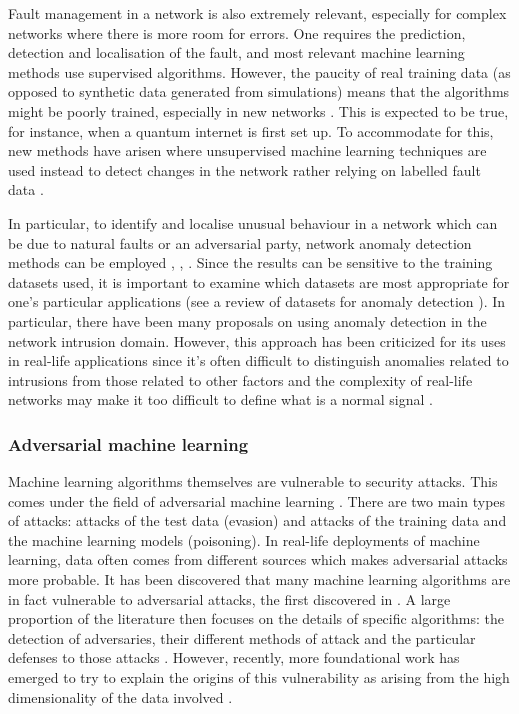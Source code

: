 \documentclass[twocolumn, aps, rmp, amsmath, amssymb, nofootinbib, superscriptaddress, longbibliography, floatfix, table-of-contents, eqsecnum]{revtex4-2}
\begin{document}
Fault management in a network is also extremely relevant, especially for complex networks where there is more room for errors. One requires the prediction, detection and localisation of the fault, and most relevant machine learning methods use supervised algorithms. However, the paucity of real training data (as opposed to synthetic data generated from simulations) means that the algorithms might be poorly trained, especially in new networks \cite{hood1997proactive, kogeda2006prediction, snow2005assessing}. This is expected to be true, for instance, when a quantum internet is first set up. To accommodate for this, new methods have arisen where unsupervised machine learning techniques are used instead to detect changes in the network rather relying on labelled fault data \cite{hajji2005statistical}.

In particular, to identify and localise unusual behaviour in a network which can be due to natural faults or an adversarial party, network anomaly detection methods can be employed \cite{ahmed2007machine}, \cite{fraley2017promise}, \cite{joseph2013machine}. Since the results can be sensitive to the training datasets used, it is important to examine which datasets are most appropriate for one's particular applications (see a review of datasets for anomaly detection \cite{yavanoglu2017review}). In particular, there have been many proposals on using anomaly detection in the network intrusion domain. However, this approach has been criticized for its uses in real-life applications since it's often difficult to distinguish anomalies
related to intrusions from those related to other factors and the complexity of real-life networks may make it too difficult to define what is a normal signal \cite{sommer2010outside}.

\subsubsection{Adversarial machine learning} 

Machine learning algorithms themselves are vulnerable to security attacks. This comes under the field of adversarial machine learning \cite{huang2011adversarial}. There are two main types of attacks: attacks of the test data (evasion) and attacks of the training data and the machine learning models (poisoning). In real-life deployments of machine learning, data often comes from different sources which makes adversarial attacks more probable. It has been discovered that many machine learning algorithms are in fact vulnerable to adversarial attacks, the first discovered in \cite{szegedy2013intriguing}. A large proportion of the literature then focuses on the details of specific algorithms: the detection of adversaries, their different methods of attack and the particular defenses to those attacks \cite{kurakin2018adversarial}. However, recently, more foundational work has emerged to try to explain the origins of this vulnerability as arising from the high dimensionality of the data involved \cite{goodfellow2014explaining, gilmer2018adversarial,mahloujifar2018curse}.
\end{document}
